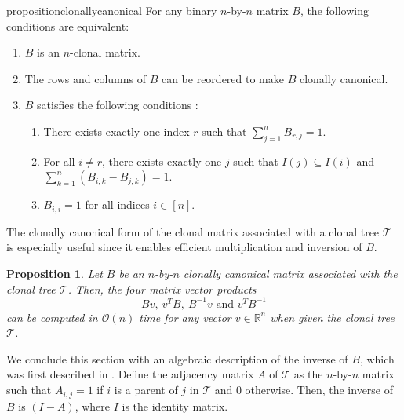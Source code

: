 \documentclass[10pt]{article}
\newtheorem{proposition}{Proposition}
\newcommand{\tree}{\mathcal{T}}
\begin{document}
\begin{restatable}{proposition}{clonallycanonical}
    \label{prop:clonally_canonical}
    For any binary $n$-by-$n$ matrix $B$, the following conditions are
    equivalent:
    \begin{enumerate}[label=(\roman*)]
        \item $B$ is an $n$-clonal matrix.
        \item The rows and columns of $B$ can be reordered to make $B$ clonally canonical.
        \item $B$ satisfies the following conditions \cite{el-kebir_reconstruction_2015}:
            \begin{enumerate}
                \item There exists exactly one index $r$ such that $\sum_{j=1}^nB_{r, j} = 1$.
                \item For all $i \neq r$, there exists exactly one $j$ such that 
                    $I(j) \subseteq I(i)$ and $\sum_{k=1}^n\left(B_{i,k} - B_{j, k}\right)= 1$.
                \item $B_{i, i} = 1$ for all indices $i \in [n]$.
            \end{enumerate}
    \end{enumerate}
\end{restatable}
The clonally canonical form of the clonal matrix associated with a clonal tree $\tree$ is 
especially useful since it enables efficient multiplication and inversion of $B$. 

\begin{proposition}
    Let $B$ be an $n$-by-$n$ clonally canonical matrix associated with the clonal tree $\tree$. Then, the four matrix vector
    products \[Bv,\ v^TB,\ B^{-1}v \text{ and } v^TB^{-1}\] can be computed in $\mathcal{O}(n)$ 
    time for any vector $v \in \mathbb{R}^n$ when given the clonal tree $\tree$.
\end{proposition}

We conclude this section with an algebraic description of the
inverse of $B$, which was first described in \cite{jia_efficient_2018}.
Define the adjacency matrix $A$ of $\tree$ as the $n$-by-$n$ matrix 
such that $A_{i, j} = 1$ if $i$ is a parent of $j$ in $\tree$ and $0$ otherwise.
Then, the inverse of $B$ is $(I - A)$, where $I$ is the identity matrix.
\end{document}
